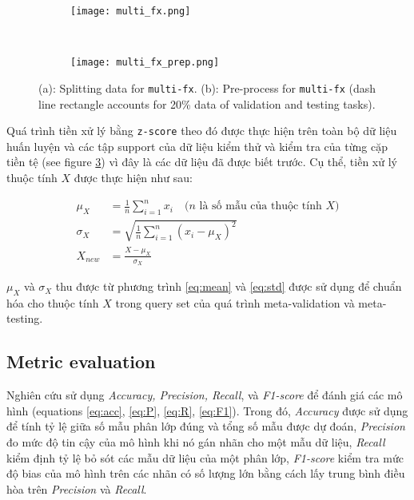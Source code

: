 \begin{figure}
    \centering
    \begin{subfigure}[b]{0.5\textwidth}
        \centering
        \texttt{[image: multi\_fx.png]}
        \caption{}
        \label{fig:multi_fx_split}
    \end{subfigure}%
    ~
    \begin{subfigure}[b]{0.5\textwidth}
        \centering
        \texttt{[image: multi\_fx\_prep.png]}
        \caption{}
        \label{fig:multi_fx_prep}
    \end{subfigure}

    \cprotect\caption{(a): Splitting data for \verb|multi-fx|. (b): Pre-process for \verb|multi-fx| (dash line rectangle accounts for 20\% data of validation and testing tasks).}
\end{figure}

Quá trình tiền xử lý bằng \verb|z-score| theo đó được thực hiện trên toàn bộ dữ liệu huấn luyện và các tập support của dữ liệu kiểm thử và kiểm tra của từng cặp tiền tệ (see figure \ref{fig:multi_fx_prep}) vì đây là các dữ liệu đã được biết trước. Cụ thể, tiền xử lý thuộc tính $X$ được thực hiện như sau:

\begin{align}
    \mu_{X} &= \frac{1}{n} \sum_{i=1}^n{x_i} \quad \text{($n$ là số mẫu của thuộc tính $X$)} \label{eq:mean}\\
    \sigma_{X} &= \sqrt{\frac{1}{n} \sum_{i=1}^n{(x_i - \mu_X)^2}} \label{eq:std}\\
    X_{new} &= \frac{X - \mu_{X}}{\sigma_{X}} \label{eq:z_score}
\end{align}

$\mu_{X}$ và $\sigma_{X}$ thu được từ phương trình \ref{eq:mean} và \ref{eq:std} được sử dụng để chuẩn hóa cho thuộc tính $X$ trong query set của quá trình meta-validation và meta-testing.

\subsection{Metric evaluation}

Nghiên cứu sử dụng \textit{Accuracy, Precision, Recall}, và \textit{F1-score} để đánh giá các mô hình (equations \ref{eq:acc}, \ref{eq:P}, \ref{eq:R}, \ref{eq:F1}). Trong đó, \textit{Accuracy} được sử dụng để tính tỷ lệ giữa số mẫu phân lớp đúng và tổng số mẫu được dự đoán, \textit{Precision} đo mức độ tin cậy của mô hình khi nó gán nhãn cho một mẫu dữ liệu, \textit{Recall} kiểm định tỷ lệ bỏ sót các mẫu dữ liệu của một phân lớp, \textit{F1-score} kiểm tra mức độ bias của mô hình trên các nhãn có số lượng lớn bằng cách lấy trung bình điều hòa trên \textit{Precision} và \textit{Recall}.

